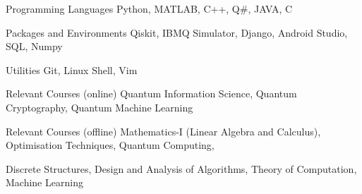 

\begin{cvskills}

  \cvskill
    {Programming Languages} %
    {Python, MATLAB, C++, Q#, JAVA, C} %

  \cvskill
    {Packages and Environments} %
    {Qiskit, IBMQ Simulator, Django, Android Studio, SQL, Numpy} %
    

  \cvskill
    {Utilities} %
    {Git, Linux Shell, Vim} %


  \cvskill
    {Relevant Courses (online)} %
    {Quantum Information Science, Quantum Cryptography, Quantum Machine Learning} %

    
  \cvskill
    {Relevant Courses (offline)}
    {Mathematics-I (Linear Algebra and Calculus), Optimisation Techniques, Quantum Computing, } 
    
  \cvskill
  {}
  {Discrete Structures, Design and Analysis of Algorithms, Theory of Computation, Machine Learning}
\end{cvskills}
